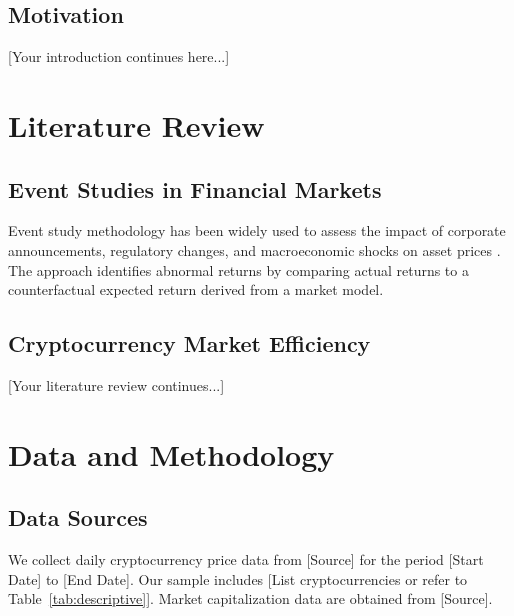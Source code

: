 \documentclass[12pt]{article}
\begin{document}
\subsection{Motivation}

[Your introduction continues here...]


\section{Literature Review}

\subsection{Event Studies in Financial Markets}

Event study methodology has been widely used to assess the impact of corporate announcements, regulatory changes, and macroeconomic shocks on asset prices \citep{fama1969, brown1985}. The approach identifies abnormal returns by comparing actual returns to a counterfactual expected return derived from a market model.

\subsection{Cryptocurrency Market Efficiency}

[Your literature review continues...]


\section{Data and Methodology}

\subsection{Data Sources}

We collect daily cryptocurrency price data from [Source] for the period [Start Date] to [End Date]. Our sample includes [List cryptocurrencies or refer to Table~\ref{tab:descriptive}]. Market capitalization data are obtained from [Source].
\end{document}
